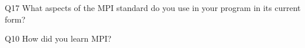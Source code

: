 \begin{description}%
\item{Q17} What aspects of the MPI standard do you use in your program in its current form?%
\item{Q10} How did you learn MPI?%
\end{description}%
